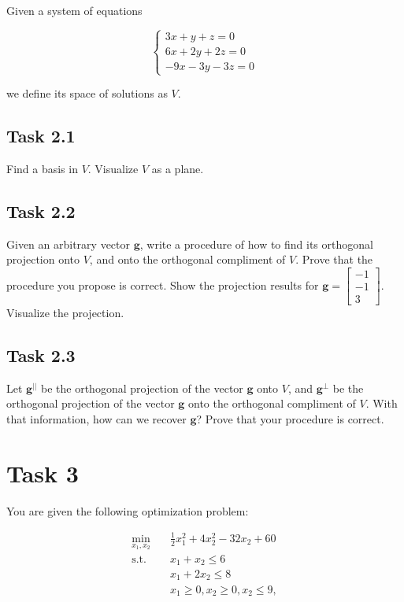 \documentclass[12pt]{article}%
\begin{document}
Given a system of equations

\begin{equation}
    \begin{cases}
    3x+y+z=0 \\
    6x+2y+2z=0 \\
    -9x-3y-3z=0
    \end{cases}
\end{equation}

we define its space of solutions as $V$.


\subsection{Task 2.1}

Find a basis in $V$. Visualize $V$ as a plane.

\subsection{Task 2.2}

Given an arbitrary vector $\mathbf{g}$, write a procedure of how to find its orthogonal projection onto $V$, and onto the orthogonal compliment of $V$. Prove that the procedure you propose is correct. Show the projection results for $\mathbf{g} = \begin{bmatrix} -1 \\ -1 \\ 3 \end{bmatrix}$. Visualize the projection.

\subsection{Task 2.3}

Let $\mathbf{g}^{||}$ be the orthogonal projection of the vector $\mathbf{g}$ onto $V$, and $\mathbf{g}^\perp$ be the orthogonal projection of the vector $\mathbf{g}$ onto the orthogonal compliment of $V$. With that information, how can we recover $\mathbf{g}$? Prove that your procedure is correct.

\section{Task 3}

You are given the following optimization problem:

\begin{equation}\label{eq:qp}
\begin{aligned}
 \min_{x_1,x_2} \quad &   \frac{1}{2} x_1^2 + 4x_2^2 -32x_2 + 60 \\
\textrm{s.t.} \quad  & x_1 + x_2 \leq 6 \\
  \quad &  x_1 + 2x_2 \leq 8\\
  \quad &  x_1 \geq 0 , x_2 \geq 0,  x_2 \leq 9,
\end{aligned}
\end{equation}
\end{document}
